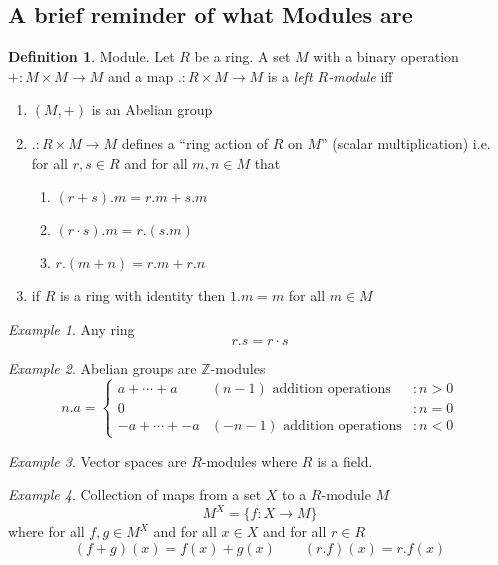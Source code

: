 \documentclass{article}
\theoremstyle{plain}
\theoremstyle{definition}
\newtheorem{defn}{Definition}[section]
\theoremstyle{remark}
\newtheorem{eg}{Example}[section]
\begin{document}
  \subsection{A brief reminder of what Modules are}
  \begin{defn}
    Module.
    Let $R$ be a ring. A set $M$ with a binary operation 
    $+:M\times M\to M$ and a map $.:R\times M\to M$ is a 
    \emph{left $R$-module} iff
    \begin{enumerate}
      \item $(M,+)$ is an Abelian group
      \item $.:R\times M\to M$ defines a ``ring action of $R$ on $M$''
        (scalar multiplication) i.e.
        for all $r,s\in R$ and for all $m,n\in M$ that
        \begin{enumerate}
          \item $(r+s).m=r.m+s.m$
          \item $(r\cdot s).m=r.(s.m)$
          \item $r.(m+n)=r.m+r.n$
        \end{enumerate}
      \item if $R$ is a ring with identity then $1.m=m$ for all $m\in M$
    \end{enumerate}
  \end{defn}
  \begin{eg}
    Any ring \[r.s = r\cdot s\]
  \end{eg}
  \begin{eg}
    Abelian groups are $\mathbb{Z}$-modules
    \[n.a=\left\{\begin{array}{llr} 
        a+\cdots+a &(n-1) \text{ addition operations}& :n>0 \\
        0 && :n=0 \\
        -a+\cdots+ -a &(-n-1) \text{ addition operations} &:n<0
      \end{array}\right.\]
  \end{eg}
  \begin{eg}
    Vector spaces are $R$-modules where $R$ is a field.
  \end{eg}
  \begin{eg}
    Collection of maps from a set $X$ to a $R$-module $M$  
    \[M^X=\{ f:X\to M \}\]
    where for all $f,g\in M^X$ and for all $x\in X$ and for all $r\in R$
    \[(f+g)(x)=f(x)+g(x)\qquad(r.f)(x)=r.f(x)\]
  \end{eg}
\end{document}
